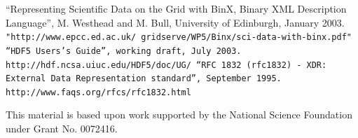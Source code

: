 \documentclass[10pt]{article}
\begin{document}
\begin{thebibliography}{d}
``Representing Scientific Data on the Grid with BinX, Binary XML Description
Language'', M. Westhead and M. Bull, University of Edinburgh, January 2003.
\tt{"http://www.epcc.ed.ac.uk/~gridserve/WP5/Binx/sci-data-with-binx.pdf"}
``HDF5 Users's Guide'', working draft, July 2003.
\tt{http://hdf.ncsa.uiuc.edu/HDF5/doc/UG/}
``RFC 1832 (rfc1832) - XDR: External Data Representation standard'',
September 1995.
\tt{http://www.faqs.org/rfcs/rfc1832.html}
\end{thebibliography}

This material is based upon work supported by the National Science Foundation under Grant No. 0072416. 
\end{document}
